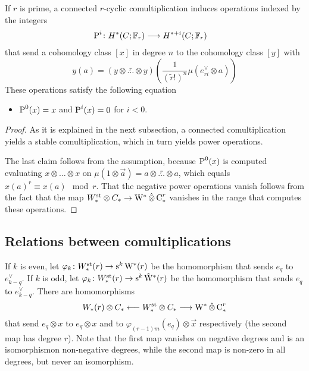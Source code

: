 \begin{proposition}
	If $r$ is prime, a connected $r$-cyclic comultiplication induces operations indexed by the integers
	\begin{align*}
		\operatorname{P}^{i}\colon H^*(C;\mathbb{F}_r)&\longrightarrow H^{*+i}(C;\mathbb{F}_r)
	\end{align*}
	that send a cohomology class $[x]$ in degree $n$ to the cohomology class $[y]$ with
	\[
	y(a) = (y\otimes \overset{r}{\ldots}\otimes y)(\frac{1}{(\tilde{r}!)^n}\mu(e_{ri}^\vee\otimes a))
	\]
	These operations satisfy the following equation
	\begin{itemize}
		\item $\operatorname{P}^0(x) = x$ and $\operatorname{P}^i(x) = 0$ for $i<0$.
	\end{itemize}
\end{proposition}

\begin{proof}
	As it is explained in the next subsection, a connected comultiplication yields a stable comultiplication, which in turn yields power operations. 

	The last claim follows from the assumption, because $\operatorname{P}^0(x)$ is computed evaluating $x\otimes \ldots\otimes x$ on $\mu(1 \otimes \vec{a}) = a\otimes\overset{r}{\ldots}\otimes a$, which equals $x(a)^{r} \equiv x(a) \mod r$. That the negative power operations vanish follows from the fact that the map $W_*^{\mathrm{st}}\otimes C_*\to \mathrm{W}^*\operatorname{\hat{\otimes}} \operatorname{C}_*^r$ vanishes in the range that computes these operations.
\end{proof}

\subsection{Relations between comultiplications}

If $k$ is even, let $\varphi_k\colon W^{\mathrm{st}}_*(r)\to \operatorname{s}^{k}\mathrm{W}^*(r)$ be the homomorphism that sends $e_q$ to $e_{k-q}^{\vee}$. If $k$ is odd, let $\varphi_k\colon W^{\mathrm{st}}_*(r)\to \operatorname{s}^{k}\hat{\mathrm{W}}^*(r)$ be the homomorphism that sends $e_q$ to $e_{k-q}^{\vee}$. There are homomorphisms
\[
W_*(r)\otimes C_* \longleftarrow W^{\mathrm{st}}_*\otimes C_*\longrightarrow \mathrm{W}^*\operatorname{\hat{\otimes}} \operatorname{C}_*^r
\]
that send $e_q\otimes x$ to $e_q\otimes x$ and to $\varphi_{(r-1)m}(e_q)\otimes \vec{x}$ respectively (the second map has degree $r$). Note that the first map vanishes on negative degrees and is an isomorphismon non-negative degrees, while the second map is non-zero in all degrees, but never an isomorphism.

